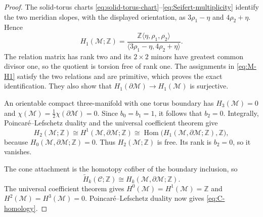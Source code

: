 \documentclass[11pt,letterpaper]{article}
\numberwithin{equation}{section}
\theoremstyle{definition}
\theoremstyle{remark}
\newcommand{\Z}{\mathbb Z}
\begin{document}
\begin{proof}
The solid-torus charts \cref{eq:solid-torus-chart}--\cref{eq:Seifert-multiplicity}
identify the two meridian slopes, with the displayed orientation, as
$3\rho_1-\eta$ and $4\rho_2+\eta$.  Hence
\[
 H_1(\mathcal M;\Z)=
 \frac{\Z\langle\eta,\rho_1,\rho_2\rangle}
 {\langle3\rho_1-\eta,4\rho_2+\eta\rangle}.
\]
The relation matrix has rank two and its $2\times2$ minors have greatest
common divisor one, so the quotient is torsion free of rank one.  The
assignments in \cref{eq:M-H1} satisfy the two relations and are primitive,
which proves the exact identification.  They also show that
$H_1(\partial\mathcal M)\to H_1(\mathcal M)$ is surjective.

An orientable compact three-manifold with one torus boundary has
$H_3(\mathcal M)=0$ and
$\chi(\mathcal M)=\tfrac12\chi(\partial\mathcal M)=0$.  Since
$b_0=b_1=1$, it follows that $b_2=0$.  Integrally,
Poincar\'e--Lefschetz duality and the universal coefficient theorem give
\[
 H_2(\mathcal M;\Z)\cong H^1(\mathcal M,\partial\mathcal M;\Z)
 \cong\operatorname{Hom}
 \bigl(H_1(\mathcal M,\partial\mathcal M;\Z),\Z\bigr),
\]
because $H_0(\mathcal M,\partial\mathcal M;\Z)=0$.  Thus
$H_2(\mathcal M;\Z)$ is free.  Its rank is $b_2=0$, so it vanishes.

The cone attachment is the homotopy cofiber of the boundary inclusion, so
\[
 \widetilde H_k(\mathcal C;\Z)
 \cong H_k(\mathcal M,\partial\mathcal M;\Z).
\]
The universal coefficient theorem gives
$H^0(\mathcal M)=H^1(\mathcal M)=\Z$ and
$H^2(\mathcal M)=H^3(\mathcal M)=0$.  Poincar\'e--Lefschetz duality now
gives \cref{eq:C-homology}.
\end{proof}
\end{document}
